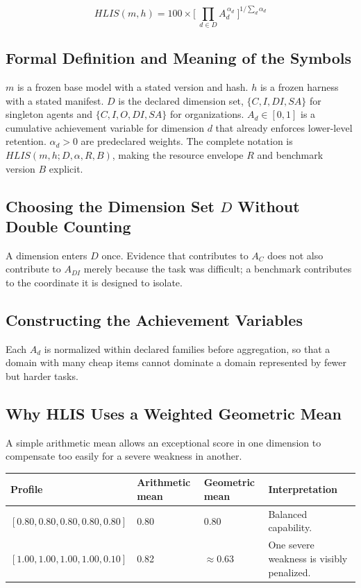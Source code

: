 \documentclass[11pt]{article}
\theoremstyle{definition}
\begin{document}
\begin{equation}
HLIS(m,h) = 100 \times \Big[\ \prod_{d \in D} A_d^{\,\alpha_d}\ \Big]^{1/\sum_d \alpha_d}
\end{equation}

\subsection{Formal Definition and Meaning of the Symbols}

$m$ is a frozen base model with a stated version and hash. $h$ is a frozen harness with a stated manifest. $D$ is the declared dimension set, $\{C,I,DI,SA\}$ for singleton agents and $\{C,I,O,DI,SA\}$ for organizations. $A_d \in [0,1]$ is a cumulative achievement variable for dimension $d$ that already enforces lower-level retention. $\alpha_d > 0$ are predeclared weights. The complete notation is $HLIS(m,h;D,\alpha,R,B)$, making the resource envelope $R$ and benchmark version $B$ explicit.

\subsection{Choosing the Dimension Set $D$ Without Double Counting}

A dimension enters $D$ once. Evidence that contributes to $A_C$ does not also contribute to $A_{DI}$ merely because the task was difficult; a benchmark contributes to the coordinate it is designed to isolate.

\subsection{Constructing the Achievement Variables}

Each $A_d$ is normalized within declared families before aggregation, so that a domain with many cheap items cannot dominate a domain represented by fewer but harder tasks.

\subsection{Why HLIS Uses a Weighted Geometric Mean}

A simple arithmetic mean allows an exceptional score in one dimension to compensate too easily for a severe weakness in another.

\begin{table}[h]
\centering\small
\begin{tabularx}{\textwidth}{@{}lllY@{}}
\toprule
Profile & Arithmetic mean & Geometric mean & Interpretation \\
\midrule
$[0.80,0.80,0.80,0.80,0.80]$ & 0.80 & 0.80 & Balanced capability. \\
$[1.00,1.00,1.00,1.00,0.10]$ & 0.82 & $\approx$0.63 & One severe weakness is visibly penalized. \\
\bottomrule
\end{tabularx}
\end{table}
\end{document}
